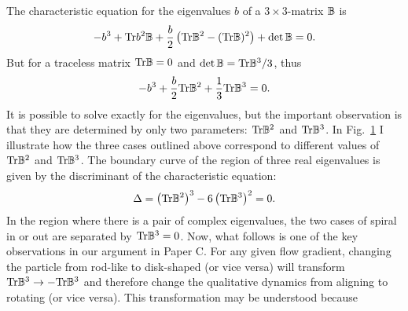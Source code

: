 \documentclass[thesis.tex]{subfiles}
\begin{document}
\begin{figure}
\begin{center}
\end{center}
\caption{\label{fig:bmap} }%
\end{figure}
The characteristic equation for the eigenvalues $b$ of a $3\times3$-matrix $\mathbb{B}$ is
\begin{align*}
	-b^3 + \mbox{Tr} b^2\mathbb{B}  + \frac{b}{2}\left(\mbox{Tr} \mathbb{B}^2-(\mbox{Tr} \mathbb{B})^2\right)+\det\mathbb{B} = 0.
\end{align*}
But for a traceless matrix $\mbox{Tr} \mathbb{B}=0$ and $\det \mathbb{B} = \mbox{Tr}\mathbb{B}^3/3$, thus
\begin{align}
	-b^3 + \frac{b}{2}\tr \ma B^2 +\frac{1}{3}\tr\ma B^3 = 0. \eqnlab{bcharacteristic}
\end{align}
It is possible to solve exactly for the eigenvalues, but the important observation is that they are determined by only two parameters: $\mbox{Tr} \mathbb{B}^2$ and $\mbox{Tr}\mathbb{B}^3$. In Fig.~\ref{fig:bmap} I illustrate how the three cases outlined above correspond to different values of $\mbox{Tr} \mathbb{B}^2$ and $\mbox{Tr}\mathbb{B}^3$. The boundary curve of the region of three real eigenvalues is given by the discriminant of the characteristic equation:
\begin{align*}
 	\Delta = \left(\mbox{Tr} \mathbb{B}^2\right)^3 - 6\left(\mbox{Tr} \mathbb{B}^3\right)^2 = 0.
 \end{align*} 
In the region where there is a pair of complex eigenvalues, the two cases of spiral in or out are separated by $\mbox{Tr} \mathbb{B}^3=0$. Now, what follows is one of the key observations in our argument in Paper C. For any given flow gradient, changing the particle from rod-like to disk-shaped (or vice versa) will transform $\mbox{Tr} \mathbb{B}^3\to-\mbox{Tr}\mathbb{B}^3$ and therefore change the qualitative dynamics from aligning to rotating (or vice versa). This transformation may be understood because
\end{document}

